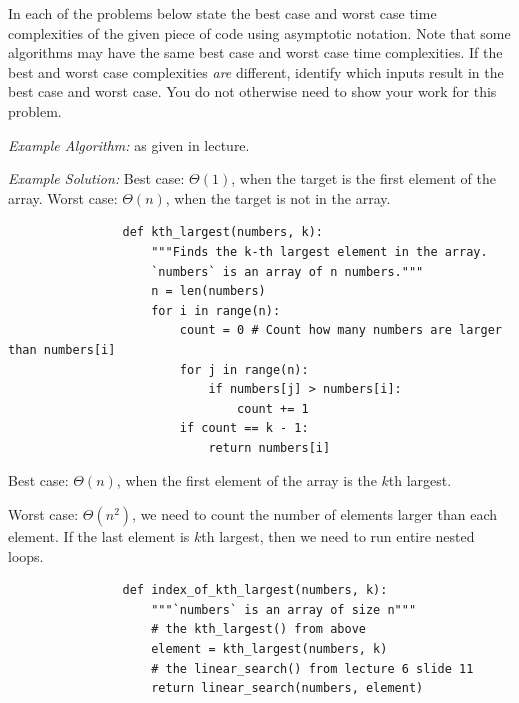 \begin{prob}
    In each of the problems below state the best case and worst case time
    complexities of the given piece of code using asymptotic notation. Note that
    some algorithms may have the same best case and worst case time complexities. If
    the best and worst case complexities \emph{are} different, identify which
    inputs result in the best case and worst case. You do not otherwise need to show your work for
    this problem.

    \emph{Example Algorithm:}  as given in lecture. 

    \emph{Example Solution:}
    Best case: $\Theta(1)$, when the target is the first element of the array.
    Worst case: $\Theta(n)$, when the target is not in the array.

    \begin{subprobset}

        \begin{subprob}
            \begin{verbatim}
                def kth_largest(numbers, k):
                    """Finds the k-th largest element in the array.
                    `numbers` is an array of n numbers."""
                    n = len(numbers)
                    for i in range(n):
                        count = 0 # Count how many numbers are larger than numbers[i]
                        for j in range(n):
                            if numbers[j] > numbers[i]:
                                count += 1
                        if count == k - 1:
                            return numbers[i]
            \end{verbatim}
            
            \begin{soln}
                Best case: $\Theta(n)$, when the first element of the array is the $k$th largest.

                Worst case: $\Theta(n^2)$, we need to count the number of elements larger than each element. If the last element is $k$th largest, then we need to run entire nested loops.
            \end{soln}
        \end{subprob}

        \begin{subprob}
            \begin{verbatim}
                def index_of_kth_largest(numbers, k):
                    """`numbers` is an array of size n"""
                    # the kth_largest() from above
                    element = kth_largest(numbers, k)
                    # the linear_search() from lecture 6 slide 11
                    return linear_search(numbers, element)
            \end{verbatim}
            


\end{subprob}
\end{subprobset}
\end{prob}
